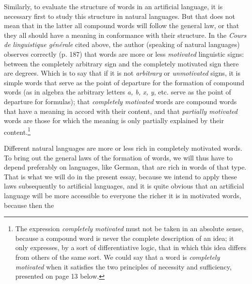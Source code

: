 {  Similarly, to evaluate the structure of words in an artificial
  language, it is necessary first to study this structure in natural
  languages. But that does not mean that in the latter all compound
  words will follow the general law, or that they all should have a
  meaning in conformance with their structure. In the \emph{Cours de
    linguistique générale} cited above, the author (speaking of
  natural languages) observes correctly (p. 187) that words are more
  or less \emph{motivated} linguistic signs: between the completely
  arbitrary sign and the completely motivated sign there are
  degrees. Which is to say that if it is not \emph{arbitrary} or
  \emph{unmotivated} signs, it is simple words that serve as the point
  of departure for the formation of compound words (as in algebra the
  arbitrary letters \emph{a, b, x, y}, etc. serve as the point of
  departure for formulas); that \emph{completely motivated} words are
  compound words that have a meaning in accord with their content, and
  that \emph{partially motivated} words are those for which the
  meaning is only partially explained by their content.\footnote{The
    expression \emph{completely motivated} must not be taken in an
    absolute sense, because a compound word is never the complete
    description of an idea; it only expresses, by a sort of
    differentiative logic, that in which this idea differs from others
    of the same sort.  We could say that a word is \emph{completely
      motivated} when it satisfies the two principles of necessity and
    sufficiency, presented on page 13 below.}

  Different natural languages are more or less rich in completely
  motivated words. To bring out the general laws of the formation of
  words, we will thus have to depend preferably on languages, like
  German, that are rich in words of that type. That is what we will do
  in the present essay, because we intend to apply these laws
  subsequently to artificial languages, and it is quite obvious that
  an artificial language will be more accessible to everyone the
  richer it is in motivated words, because then the

  }
  

